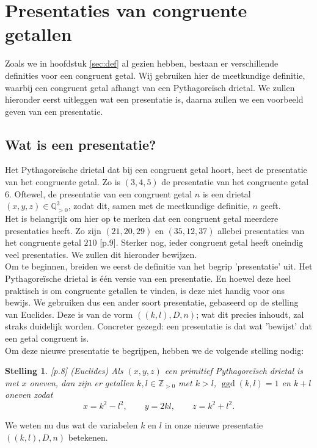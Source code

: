 \documentclass[12pt,reqno]{article}
\newcommand*{\ZZ}{\ensuremath{\mathbb{Z}}}
\newcommand*{\QQ}{\ensuremath{\mathbb{Q}}}
\theoremstyle{theorem}
\newtheorem{theorem}{Stelling}
\theoremstyle{definition}
\DeclareMathOperator{\ggd}{ggd}
\begin{document}
	
	\section{Presentaties van congruente getallen}\label{sec:lotte}
	Zoals we in hoofdstuk \ref{sec:def} al gezien hebben, bestaan er verschillende definities voor een congruent getal. Wij gebruiken hier de meetkundige definitie, waarbij een congruent getal afhangt van een Pythagore\"isch drietal. We zullen hieronder eerst uitleggen wat een presentatie is, daarna zullen we een voorbeeld geven van een presentatie.
	
	\subsection{Wat is een presentatie?}\label{sec:presentaties}
	Het Pythagore\"ische drietal dat bij een congruent getal hoort, heet de presentatie van het congruente getal. Zo is $(3,4,5)$ de presentatie van het congruente getal $6$. Oftewel,  de presentatie van een congruent getal $n$ is een drietal $(x,y,z)\in\QQ^3_{>0}$, zodat dit, samen met de meetkundige definitie, $n$ geeft.\\
	
	Het is belangrijk om hier op te merken dat een congruent getal meerdere presentaties heeft. Zo zijn $(21,20,29)$ en $(35,12,37)$ allebei presentaties van het congruente getal $210$ \cite{Oort}[p.9]. Sterker nog, ieder congruent getal heeft oneindig veel presentaties. We zullen dit hieronder bewijzen.\\
	
	Om te beginnen, breiden we eerst de definitie van het begrip 'presentatie' uit. Het Pythagore\"ische drietal is \'e\'en versie van een presentatie. En hoewel deze heel praktisch is om congruente getallen te vinden, is deze niet handig voor ons bewijs. We gebruiken dus een ander soort presentatie, gebaseerd op de stelling van Euclides. Deze is van de vorm $((k,l),D,n)$; wat dit precies inhoudt, zal straks duidelijk worden. Concreter gezegd: een presentatie is dat wat 'bewijst' dat een getal congruent is.\\
	
	Om deze nieuwe presentatie te begrijpen, hebben we de volgende stelling nodig:
	\begin{theorem}\label{def:euclides}
		\cite{Oort}[p.8] (Euclides) Als $(x,y,z)$ een primitief Pythagore\"isch drietal is met $x$ oneven, dan zijn er getallen $k,l\in\ZZ_{>0}$ met $k>l$, $\ggd(k,l)=1$ en $k+l$ oneven zodat
		\begin{equation*}
			x=k^2-l^2,\qquad y=2kl,\qquad z=k^2+l^2.
		\end{equation*}
	\end{theorem}
	\noindent We weten nu dus wat de variabelen $k$ en $l$ in onze nieuwe presentatie $((k,l),D,n)$ betekenen.\\
	
\end{document}

